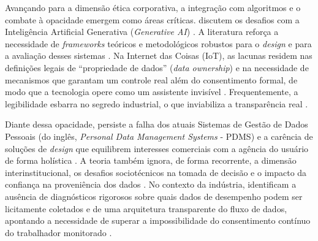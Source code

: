 \documentclass[
	12pt,				%
	oneside,			%
	a4paper,			%
	english,			%
	brazil				%
	]{abntex2ppgsi}
\begin{document}
    Avançando para a dimensão ética corporativa, a integração com algoritmos e o combate à opacidade emergem como áreas críticas.  discutem os desafios com a Inteligência Artificial Generativa (\textit{Generative AI}) \cite{Locoro2020}. A literatura reforça a necessidade de \textit{frameworks} teóricos e metodológicos robustos para o \textit{design} e para a avaliação desses sistemas \cite{Strey2019Human, malgieri2019automated, Lindley2020, Coleti2020TR}. Na Internet das Coisas (IoT), as lacunas residem nas definições legais de ``propriedade de dados'' (\textit{data ownership}) e na necessidade de mecanismos que garantam um controle real além do consentimento formal, de modo que a tecnologia opere como um assistente invisível \cite{janecek2018ownership}. Frequentemente, a legibilidade esbarra no segredo industrial, o que inviabiliza a transparência real \cite{Coleti2020TR, Barreto2018}. 

    Diante dessa opacidade, persiste a falha dos atuais Sistemas de Gestão de Dados Pessoais (do inglês, \textit{Personal Data Management Systems} - PDMS) e a carência de soluções de \textit{design} que equilibrem interesses comerciais com a agência do usuário de forma holística \cite{angelopoulos2021stewardship, Crabtree2016}. A teoria também ignora, de forma recorrente, a dimensão interinstitucional, os desafios sociotécnicos na tomada de decisão e o impacto da confiança na proveniência dos dados \cite{sailaja2021exploring, mu2024institutional, Briggs2021, Seidelin2018}. No contexto da indústria,  identificam a ausência de diagnósticos rigorosos sobre quais dados de desempenho podem ser licitamente coletados e de uma arquitetura transparente do fluxo de dados, apontando a necessidade de superar a impossibilidade do consentimento contínuo do trabalhador monitorado \cite{Locoro2020, Hutton2017}.
\end{document}
